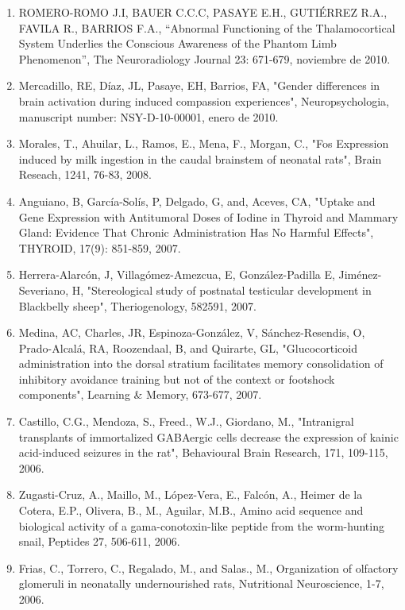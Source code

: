 \begin{enumerate}
\item ROMERO-ROMO J.I, BAUER C.C.C, PASAYE E.H., GUTIÉRREZ R.A., FAVILA R., BARRIOS F.A., “Abnormal Functioning of the 
Thalamocortical System Underlies the Conscious Awareness of the Phantom Limb Phenomenon”, The Neuroradiology Journal 23: 
671-679, noviembre de 2010.

\item Mercadillo, RE, Díaz, JL, Pasaye, EH, Barrios, FA, "Gender differences in brain activation during induced compassion 
experiences", Neuropsychologia, manuscript number: NSY-D-10-00001, enero de 2010.

\item Morales, T., Ahuilar, L., Ramos, E., Mena, F., Morgan, C., "Fos Expression induced by milk ingestion in the caudal 
brainstem of neonatal rats", Brain Reseach, 1241, 76-83, 2008.

\item Anguiano, B, García-Solís, P, Delgado, G, and, Aceves, CA, "Uptake and Gene Expression with Antitumoral Doses of 
Iodine 
in Thyroid and Mammary Gland: Evidence That Chronic Administration Has No Harmful Effects", THYROID, 17(9): 851-859, 2007.

\item Herrera-Alarcón, J, Villagómez-Amezcua, E, González-Padilla E, Jiménez-Severiano, H, "Stereological study of 
postnatal 
testicular development in Blackbelly sheep", Theriogenology, 582591, 2007.

\item Medina, AC, Charles, JR, Espinoza-González, V, Sánchez-Resendis, O, Prado-Alcalá, RA, Roozendaal, B, and Quirarte, 
GL, 
"Glucocorticoid administration into the dorsal stratium facilitates memory consolidation of inhibitory avoidance training 
but not of the context or footshock components", Learning \& Memory, 673-677, 2007.

\item Castillo, C.G., Mendoza, S., Freed., W.J., Giordano, M., "Intranigral transplants of immortalized GABAergic cells 
decrease the expression of kainic acid-induced seizures in the rat", Behavioural Brain Research, 171, 109-115, 2006.

\item Zugasti-Cruz, A., Maillo, M., López-Vera, E., Falcón, A., Heimer de la Cotera, E.P., Olivera, B., M., Aguilar, M.B., 
Amino acid sequence and biological activity of a gama-conotoxin-like peptide from the worm-hunting snail, Peptides 27, 
506-611, 2006.

\item Frias, C., Torrero, C., Regalado, M., and Salas., M., Organization of olfactory glomeruli in neonatally 
undernourished 
rats, Nutritional Neuroscience, 1-7, 2006.


\end{enumerate}
